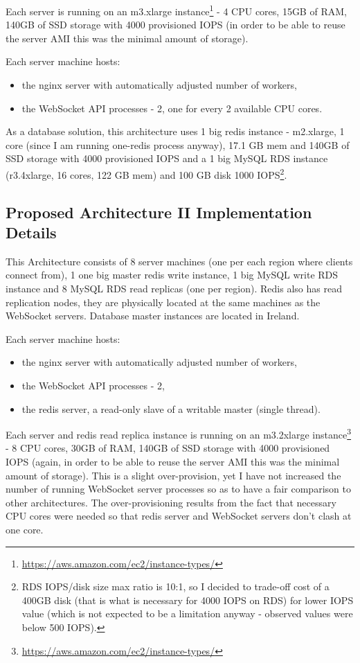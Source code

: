 \documentclass{uvamscse}
\begin{document}
Each server is running on an m3.xlarge instance\footnote{\url{https://aws.amazon.com/ec2/instance-types/}} - 4 CPU cores, 15GB of RAM, 140GB of SSD storage with 4000 provisioned IOPS (in order to be able to reuse the server AMI this was the minimal amount of storage).

Each server machine hosts:
\begin{itemize}
  \item the nginx server with automatically adjusted number of workers,
  \item the WebSocket API processes - 2, one for every 2 available CPU cores.
\end{itemize}

As a database solution, this architecture uses 1 big redis instance - m2.xlarge, 1 core (since I am running one-redis process anyway), 17.1 GB mem and 140GB of SSD storage with 4000 provisioned IOPS and a 1 big MySQL RDS instance (r3.4xlarge, 16 cores, 122 GB mem) and 100 GB disk 1000 IOPS\footnote{RDS IOPS/disk size max ratio is 10:1, so I decided to trade-off cost of a 400GB disk (that is what is necessary for 4000 IOPS on RDS) for lower IOPS value (which is not expected to be a limitation anyway - observed values were below 500 IOPS).}.

\subsection{Proposed Architecture II Implementation Details}\label{Proposed Architecture II Implementation Details}

This Architecture consists of 8 server machines (one per each region where clients connect from), 1 one big master redis write instance, 1 big MySQL write RDS instance and 8 MySQL RDS read replicas (one per region). Redis also has read replication nodes, they are physically located at the same machines as the WebSocket servers. Database master instances are located in Ireland.

Each server machine hosts:
\begin{itemize}
  \item the nginx server with automatically adjusted number of workers,
  \item the WebSocket API processes - 2,
  \item the redis server, a read-only slave of a writable master (single thread).
\end{itemize}

Each server and redis read replica instance is running on an m3.2xlarge instance\footnote{\url{https://aws.amazon.com/ec2/instance-types/}} - 8 CPU cores, 30GB of RAM, 140GB of SSD storage with 4000 provisioned IOPS (again, in order to be able to reuse the server AMI this was the minimal amount of storage). This is a slight over-provision, yet I have not increased the number of running WebSocket server processes so as to have a fair comparison to other architectures. The over-provisioning results from the fact that necessary CPU cores were needed so that redis server and WebSocket servers don't clash at one core.
\end{document}
